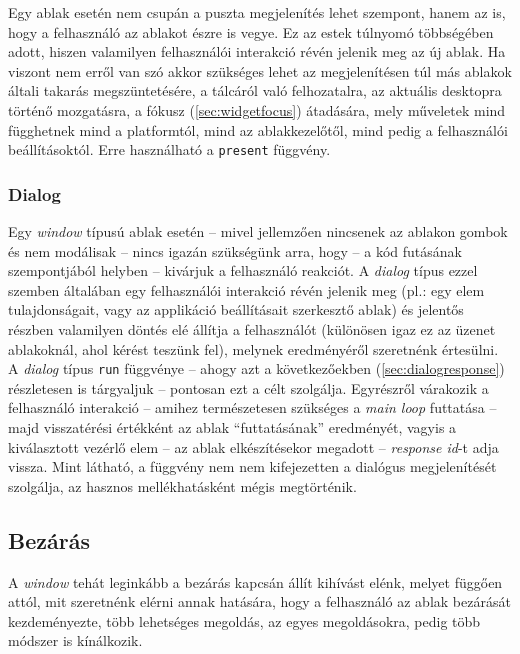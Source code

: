 Egy ablak esetén nem csupán a puszta megjelenítés lehet szempont, hanem az is, hogy a felhasználó az ablakot észre is vegye. Ez az estek túlnyomó többségében adott, hiszen valamilyen felhasználói interakció révén jelenik meg az új ablak. Ha viszont nem erről van szó akkor szükséges lehet az megjelenítésen túl más ablakok általi takarás megszüntetésére, a tálcáról való felhozatalra, az aktuális desktopra  történő mozgatásra, a fókusz (\ref{sec:widgetfocus}) átadására, mely műveletek mind függhetnek mind a platformtól, mind az ablakkezelőtől, mind pedig a felhasználói beállításoktól. Erre használható a \texttt{present} függvény.

\subsubsection{Dialog}

Egy \textit{window} típusú ablak esetén -- mivel jellemzően nincsenek az ablakon gombok és nem modálisak -- nincs igazán szükségünk arra, hogy -- a kód futásának szempontjából helyben -- kivárjuk a felhasználó reakciót. A \textit{dialog} típus ezzel szemben általában egy felhasználói interakció révén jelenik meg (pl.: egy elem tulajdonságait, vagy az applikáció beállításait szerkesztő ablak) és jelentős részben valamilyen döntés elé állítja a felhasználót (különösen igaz ez az üzenet ablakoknál, ahol kérést teszünk fel), melynek eredményéről szeretnénk értesülni. A \textit{dialog} típus \texttt{run} függvénye -- ahogy azt a következőekben (\ref{sec:dialogresponse}) részletesen is tárgyaljuk -- pontosan ezt a célt szolgálja. Egyrészről várakozik a felhasználó interakció -- amihez természetesen szükséges a \textit{main loop} futtatása -- majd visszatérési értékként az ablak ``futtatásának'' eredményét, vagyis a kiválasztott vezérlő elem -- az ablak elkészítésekor megadott -- \textit{response id}-t adja vissza. Mint látható, a függvény nem nem kifejezetten a dialógus megjelenítését szolgálja, az hasznos mellékhatásként mégis megtörténik.

\subsection{Bezárás}

A \textit{window} tehát leginkább a bezárás kapcsán állít kihívást elénk, melyet függően attól, mit szeretnénk elérni annak hatására, hogy a felhasználó az ablak bezárását kezdeményezte, több lehetséges megoldás, az egyes megoldásokra, pedig több módszer is kínálkozik.

